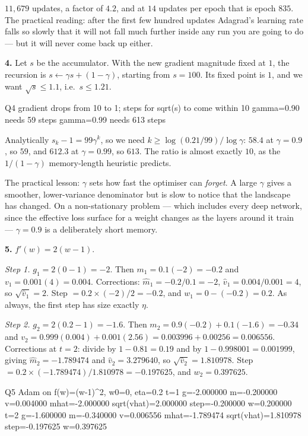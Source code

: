 \documentclass[11pt]{article}
\begin{document}
$11{,}679$ updates, a factor of $4.2$, and at $14$ updates per epoch that is
epoch $835$. The practical reading: after the first few hundred updates
Adagrad's learning rate falls so slowly that it will not fall much further
inside any run you are going to do --- but it will never come back up either.

\medskip
\textbf{4.} Let $s$ be the accumulator. With the new gradient magnitude fixed at
$1$, the recursion is $s \leftarrow \gamma s + (1-\gamma)$, starting from
$s = 100$. Its fixed point is $1$, and we want $\sqrt{s} \le 1.1$, i.e.\
$s \le 1.21$.

\begin{codeout}
Q4  gradient drops from 10 to 1; steps for sqrt(s) to come within 10%
    gamma=0.90  needs   59 steps
    gamma=0.99  needs  613 steps
\end{codeout}

Analytically $s_k - 1 = 99\gamma^k$, so we need $k \ge \log(0.21/99)/\log
\gamma$: $58.4$ at $\gamma = 0.9$, so $59$, and $612.3$ at $\gamma = 0.99$, so
$613$. The ratio is almost exactly $10$, as the $1/(1-\gamma)$ memory-length
heuristic predicts.

The practical lesson: $\gamma$ sets how fast the optimiser can \emph{forget}. A
large $\gamma$ gives a smoother, lower-variance denominator but is slow to
notice that the landscape has changed. On a non-stationary problem --- which
includes every deep network, since the effective loss surface for a weight
changes as the layers around it train --- $\gamma = 0.9$ is a deliberately
short memory.

\medskip
\textbf{5.} $f'(w) = 2(w-1)$.

\emph{Step 1.} $g_1 = 2(0-1) = -2$. Then $m_1 = 0.1(-2) = -0.2$ and
$v_1 = 0.001(4) = 0.004$. Corrections: $\hat m_1 = -0.2/0.1 = -2$,
$\hat v_1 = 0.004/0.001 = 4$, so $\sqrt{\hat v_1} = 2$. Step
$= 0.2 \times (-2)/2 = -0.2$, and $w_1 = 0 - (-0.2) = 0.2$. As always, the
first step has size exactly $\eta$.

\emph{Step 2.} $g_2 = 2(0.2-1) = -1.6$. Then
$m_2 = 0.9(-0.2) + 0.1(-1.6) = -0.34$ and
$v_2 = 0.999(0.004) + 0.001(2.56) = 0.003996 + 0.00256 = 0.006556$.
Corrections at $t = 2$: divide by $1-0.81 = 0.19$ and by
$1 - 0.998001 = 0.001999$, giving $\hat m_2 = -1.789474$ and
$\hat v_2 = 3.279640$, so $\sqrt{\hat v_2} = 1.810978$. Step
$= 0.2 \times (-1.789474)/1.810978 = -0.197625$, and $w_2 = 0.397625$.

\begin{codeout}
Q5  Adam on f(w)=(w-1)^2, w0=0, eta=0.2
    t=1  g=-2.000000  m=-0.200000  v=0.004000
          mhat=-2.000000  sqrt(vhat)=2.000000  step=-0.200000  w=0.200000
    t=2  g=-1.600000  m=-0.340000  v=0.006556
          mhat=-1.789474  sqrt(vhat)=1.810978  step=-0.197625  w=0.397625
\end{codeout}
\end{document}
